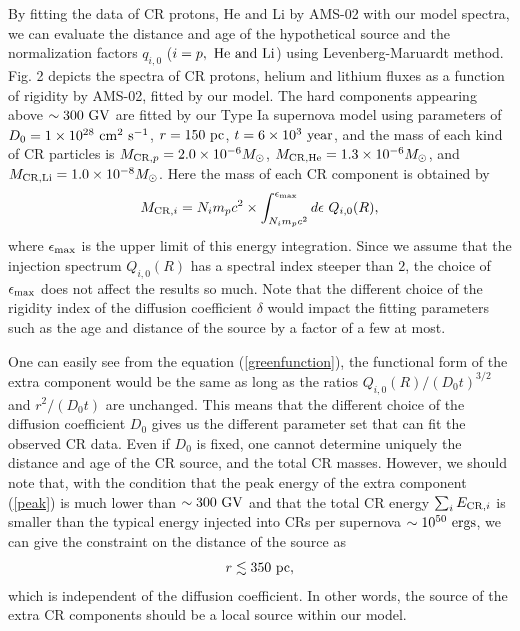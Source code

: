 \documentclass[twocolumn,showpacs,amsmath,amssymb]{revtex4-1}
\begin{document}
By fitting the data of CR protons, He and Li by AMS-02 with our model spectra, we can evaluate the distance and age of the hypothetical source and the normalization factors $q_{i,0}$ ($i=p,~{\rm He}~{\rm and}~{\rm Li}$) using Levenberg-Maruardt method.  Fig. 2 depicts the spectra of CR protons, helium and lithium fluxes as a function of rigidity by AMS-02, fitted by our model.  The hard components appearing above $\sim 300~{\rm GV}$ are fitted by our Type Ia supernova model using parameters of $D_0=1\times 10^{28}~{\rm cm}^2~{\rm s}^{-1}$, $r=150~{\rm pc}$, $t=6\times10^3~{\rm year}$, and the mass of each kind of CR particles is $M_{{\rm CR},p}=2.0\times 10^{-6}M_{\odot}$, $M_{\rm CR,He}=1.3\times 10^{-6}M_{\odot}$, and $M_{\rm CR,Li}=1.0\times 10^{-8}M_{\odot}$.   Here the mass of each CR component is obtained by
\begin{eqnarray}
M_{{\rm CR},i}=N_i m_p c^2 \times \int_{N_i m_pc^2}^{\epsilon_{\rm max}}d\epsilon~ Q_{i,0}(R),
\end{eqnarray}
where $\epsilon_{\rm max}$ is the upper limit of this energy integration.  Since we assume that the injection spectrum $Q_{i,0}(R)$ has a spectral index steeper than $2$, the choice of $\epsilon_{\rm max}$ does not affect the results so much.  Note that the different choice of the rigidity index of the diffusion coefficient $\delta$ would impact the fitting parameters such as the age and distance of the source by a factor of a few at most.

One can easily see from the equation (\ref{greenfunction}), the functional form of the extra component would be the same as long as the ratios $Q_{i,0}(R)/(D_0t)^{3/2}$ and $r^2/(D_0t)$ are unchanged.  This means that the different choice of the diffusion coefficient $D_0$ gives us the different parameter set that can fit the observed CR data.  Even if $D_0$ is fixed, one cannot determine uniquely the distance and age of the CR source, and the total CR masses.  However, we should note that, with the condition that the peak energy of the extra component (\ref{peak}) is much lower than $\sim 300~{\rm GV}$ and that the total CR energy $\sum_i E_{{\rm CR},i}$ is smaller than the typical energy injected into CRs per supernova $\sim 10^{50}~{\rm ergs}$, we can give the constraint on the distance of the source as
\begin{eqnarray}
r \lesssim 350~{\rm pc},
\end{eqnarray}
which is independent of the diffusion coefficient.  In other words, the source of the extra CR components should be a local source within our model.
\end{document}
